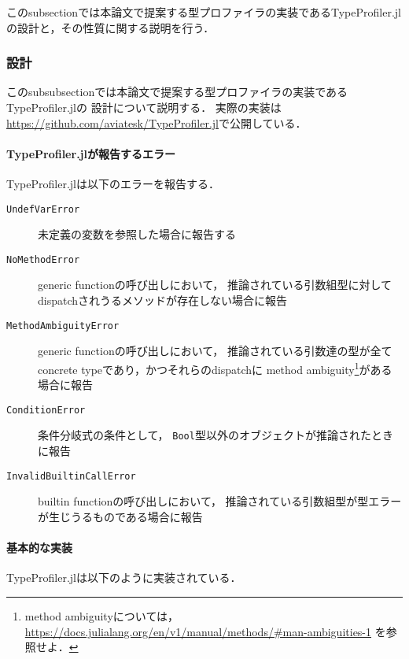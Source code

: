 このsubsectionでは本論文で提案する型プロファイラの実装であるTypeProfiler.jlの設計と，その性質に関する説明を行う．

\subsubsection{設計} \label{subsubsection:type-profiler-design}

このsubsubsectionでは本論文で提案する型プロファイラの実装であるTypeProfiler.jlの
設計について説明する．
実際の実装は\url{https://github.com/aviatesk/TypeProfiler.jl}で公開している．

\paragraph{TypeProfiler.jlが報告するエラー} \label{paragraph:type-profiler-error-statement}

TypeProfiler.jlは以下のエラーを報告する．

\begin{description}
  \item [\texttt{UndefVarError}] 未定義の変数を参照した場合に報告する
  \item [\texttt{NoMethodError}] generic functionの呼び出しにおいて，
        推論されている引数組型に対してdispatchされうるメソッドが存在しない場合に報告
  \item [\texttt{MethodAmbiguityError}] generic functionの呼び出しにおいて，
        推論されている引数達の型が全てconcrete typeであり，かつそれらのdispatchに
        method ambiguity\footnote{
          method ambiguityについては，
          \url{https://docs.julialang.org/en/v1/manual/methods/\#man-ambiguities-1}
          を参照せよ．
        }がある場合に報告
  \item [\texttt{ConditionError}] 条件分岐式の条件として，
        \verb|Bool|型以外のオブジェクトが推論されたときに報告
  \item [\texttt{InvalidBuiltinCallError}] builtin functionの呼び出しにおいて，
        推論されている引数組型が型エラーが生じうるものである場合に報告
\end{description}

\paragraph{基本的な実装} \label{paragraph:type-profiler-basic-implementation}

TypeProfiler.jlは以下のように実装されている．

